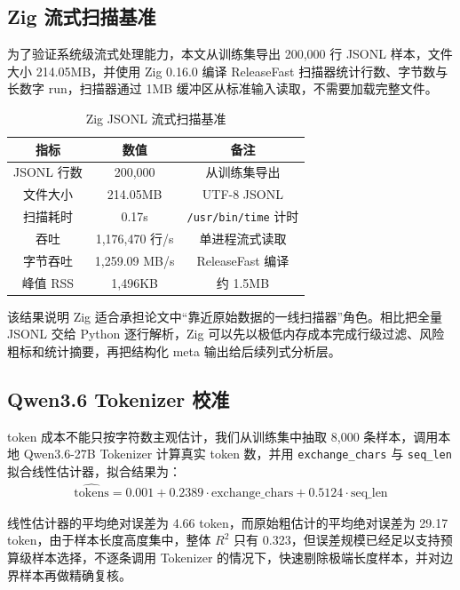 \documentclass{article}
\begin{document}
\subsection{Zig 流式扫描基准}
为了验证系统级流式处理能力，本文从训练集导出 200,000 行 JSONL 样本，文件大小 214.05MB，并使用 Zig 0.16.0 编译 ReleaseFast 扫描器统计行数、字节数与长数字 run，扫描器通过 1MB 缓冲区从标准输入读取，不需要加载完整文件。

\begin{table}[htbp]
    \centering
    \renewcommand{\arraystretch}{1.2}
    \setlength{\tabcolsep}{30pt}
    \caption{Zig JSONL 流式扫描基准}
    \begin{tabular}{ccc}
        \toprule[1.5pt]
        指标 & 数值 & 备注 \\
        \midrule[0.75pt]
        JSONL 行数 & 200,000 & 从训练集导出 \\
        文件大小 & 214.05MB & UTF-8 JSONL \\
        扫描耗时 & 0.17s & \texttt{/usr/bin/time} 计时 \\
        吞吐 & 1,176,470 行/s & 单进程流式读取 \\
        字节吞吐 & 1,259.09 MB/s & ReleaseFast 编译 \\
        峰值 RSS & 1,496KB & 约 1.5MB \\
        \bottomrule[1.5pt]
    \end{tabular}
\end{table}

该结果说明 Zig 适合承担论文中“靠近原始数据的一线扫描器”角色。相比把全量 JSONL 交给 Python 逐行解析，Zig 可以先以极低内存成本完成行级过滤、风险粗标和统计摘要，再把结构化 meta 输出给后续列式分析层。



\subsection{Qwen3.6 Tokenizer 校准}
token 成本不能只按字符数主观估计，我们从训练集中抽取 8,000 条样本，调用本地 Qwen3.6-27B Tokenizer 计算真实 token 数，并用 \texttt{exchange\_chars} 与 \texttt{seq\_len} 拟合线性估计器，拟合结果为：
\begin{align}
    \widehat{\mathrm{tokens}}=0.001+0.2389\cdot\mathrm{exchange\_chars}+0.5124\cdot\mathrm{seq\_len}
\end{align}

线性估计器的平均绝对误差为 4.66 token，而原始粗估计的平均绝对误差为 29.17 token，由于样本长度高度集中，整体 $R^2$ 只有 0.323，但误差规模已经足以支持预算级样本选择，不逐条调用 Tokenizer 的情况下，快速剔除极端长度样本，并对边界样本再做精确复核。
\end{document}

